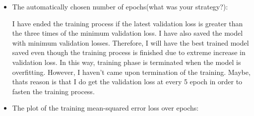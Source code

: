 \documentclass[12pt]{article}
\begin{document}
    \begin{itemize}
        \item The automatically chosen number of epochs(what was your strategy?):
        
		I have ended the training process if the latest validation loss is greater than the three times of the minimum validation loss. I have also saved the model with minimum validation losses. Therefore, I will have the best trained model saved even though the training process is finished due to extreme increase in validation loss. In this way, training phase is terminated when the model is overfitting. However, I haven't came upon termination of the training. Maybe, thats reason is that I do get the validation loss at every 5 epoch in order to fasten the training process.
        
        \item The plot of the training mean-squared error loss over epochs:
		 

\end{itemize}
\end{document}
